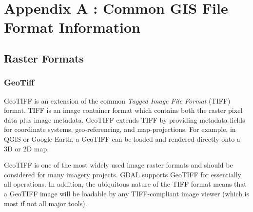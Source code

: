 %
%



\chapter*{Appendix A : Common GIS File Format Information}


\section*{Raster Formats}


\subsection*{GeoTiff}
GeoTIFF is an extension of the common \emph{Tagged Image File Format} (TIFF) format.  TIFF
is an image container format which contains both the raster pixel data plus image metadata.  
GeoTIFF extends TIFF by providing metadata fields for coordinate systems, geo-referencing, and 
map-projections.  For example, in QGIS or Google Earth, a GeoTIFF can be loaded and rendered 
directly onto a 3D or 2D map.
    
GeoTIFF is one of the most widely used image raster formats and should be considered for many 
imagery projects.  GDAL supports GeoTIFF for essentially all operations.  In addition, the 
ubiquitous nature of the TIFF format means that a GeoTIFF image will be loadable by any TIFF-compliant
image viewer (which is most if not all major tools).



